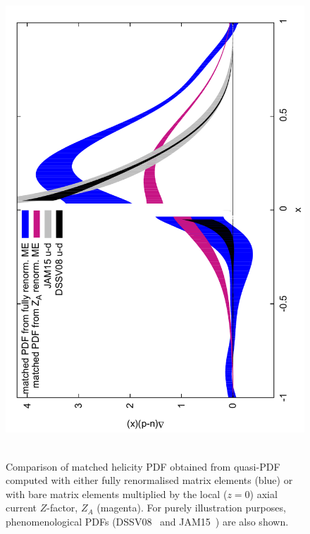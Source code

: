 \begin{figure}[t]
\centering
\includegraphics[scale=0.4,angle=-90]{plots/qmatched_bare_vs_fit69v2}\,\,\,
\vspace*{-0.3cm}
\begin{minipage}{15cm}
\hspace*{3cm}
\caption{\small Comparison of matched helicity PDF obtained from quasi-PDF 
computed with either fully renormalised matrix elements (blue) 
or with bare matrix elements multiplied by the local ($z{=}0$) 
axial current $Z$-factor, $Z_A$ (magenta). For purely illustration purposes, 
phenomenological PDFs (DSSV08~\cite{deFlorian:2009vb} and 
JAM15~\cite{Sato:2016tuz}) are also shown.}
\label{fig:matched} 
\end{minipage}
\end{figure}
